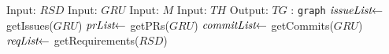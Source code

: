 \setphaserulewidth{0.4pt}

\begin{breakablealgorithm}
\label{alg:process-software-artifacts}
\begin{algorithmic}[1]
\State Input: $RSD$ 
\State Input: $GRU$  
\State Input: $M$  
\State Input: $TH$  
\State Output: $TG$ : \texttt{graph} 
\State $\textit{issueList} \hspace{-0.1cm} \leftarrow$  \hspace{-0.2cm} getIssues($GRU$)\label{algl:m}
\State $\textit{prList} \hspace{-0.1cm} \leftarrow$  \hspace{-0.2cm} getPRs($GRU$)\label{algl:m}
\State $\textit{commitList} \hspace{-0.1cm} \leftarrow$  \hspace{-0.2cm} getCommits($GRU$)\label{algl:m}
\State $\textit{reqList} \hspace{-0.1cm} \leftarrow$  \hspace{-0.2cm} getRequirements($RSD$)\label{algl:m}



\end{algorithmic}
\end{breakablealgorithm}
